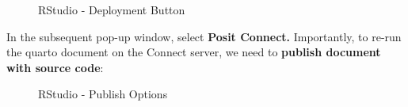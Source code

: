 \documentclass[
  letterpaper,
  DIV=11,
  numbers=noendperiod]{scrreprt}
\begin{document}
\begin{figure}


\caption{\label{fig-deployment-button}RStudio - Deployment Button}

\end{figure}%

In the subsequent pop-up window, select \textbf{Posit Connect.}
Importantly, to re-run the quarto document on the Connect server, we
need to \textbf{publish document with source code}:

\begin{figure}


\caption{\label{fig-with-source-code}RStudio - Publish Options}

\end{figure}%
\end{document}
